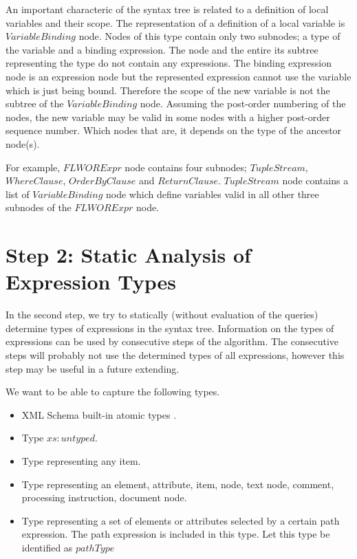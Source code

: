 An important characteric of the syntax tree is related to a definition of local variables and their scope. The representation of a definition of a local variable is $VariableBinding$ node. Nodes of this type contain only two subnodes; a type of the variable and a binding expression. The node and the entire its subtree representing the type do not contain any expressions. The binding expression node is an expression node but the represented expression cannot use the variable which is just being bound. Therefore the scope of the new variable is not the subtree of the $VariableBinding$ node. Assuming the post-order numbering of the nodes, the new variable may be valid in some nodes with a higher post-order sequence number. Which nodes that are, it depends on the type of the ancestor node(s).

For example, $FLWORExpr$ node contains four subnodes; $TupleStream$, $WhereClause$, $OrderByClause$ and $ReturnClause$. $TupleStream$ node contains a list of $VariableBinding$ node which define variables valid in all other three subnodes of the $FLWORExpr$ node.


\section{Step 2: Static Analysis of Expression Types}
In the second step, we try to statically (without evaluation of the queries) determine types of expressions in the syntax tree. Information on the types of expressions can be used by consecutive steps of the algorithm. The consecutive steps will probably not use the determined types of all expressions, however this step may be useful in a future extending.

We want to be able to capture the following types.

\begin{itemize}
\item XML Schema built-in atomic types .
\item Type $xs:untyped$.
\item Type representing any item. 
\item Type representing an element, attribute, item, node, text node, comment, processing instruction, document node.
\item Type representing a set of elements or attributes selected by a certain path expression. The path expression is included in this type. Let this type be identified as $pathType$
\end{itemize}

